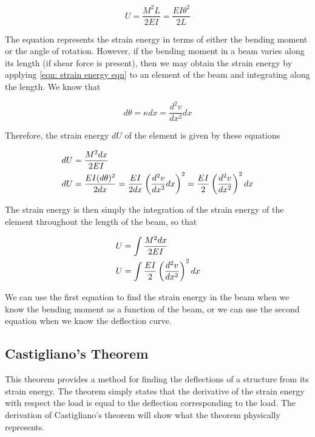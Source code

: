 \documentclass[
fontsize=10pt,
a4paper,
twosides=false,
open=any,
svgnames,
]{kaobook} %
\begin{document}
\begin{equation} \label{eqn: strain energy eqn}
  U = \frac{M^2L}{2EI} = \frac{EI\theta ^2}{2L}
\end{equation}

The equation represents the strain energy in terms of either the bending moment or the angle of rotation. However, if the bending moment in a beam varies along its length (if shear force is present), then we may obtain the strain energy by applying \cref{eqn: strain energy eqn} to an element of the beam and integrating along the length. We know that

\[d\theta  = \kappa dx = \frac{{{d^2}v}}{{d{x^2}}}dx\]

Therefore, the strain energy $dU$ of the element is given by these equations

\[\begin{gathered}
  dU = \frac{M^2dx}{2EI} \hfill \\
  dU = \frac{EI(d\theta )^2}{2dx} = \frac{EI}{2dx}\left( \frac{d^2v}{dx^2}dx \right)^2 = \frac{EI}{2}\left( \frac{d^2v}{dx^2} \right)^2dx \hfill \\ 
\end{gathered} \]

The strain energy is then simply the integration of the strain energy of the element throughout the length of the beam, so that

\begin{equation}
  \begin{gathered}
    U = \int \frac{M^2dx}{2EI}  \hfill \\
    U = \int \frac{EI}{2} \left( \frac{d^2v}{dx^2} \right)^2dx  \hfill \\ 
  \end{gathered}
\end{equation}

We can use the first equation to find the strain energy in the beam when we know the bending moment as a function of the beam, or we can use the second equation when we know the deflection curve.

\subsection{Castigliano’s Theorem}

This theorem provides a method for finding the deflections of a structure from its strain energy. The theorem simply states that the derivative of the strain energy with respect the load is equal to the deflection corresponding to the load. The derivation of Castigliano’s theorem will show what the theorem physically represents.
\end{document}
